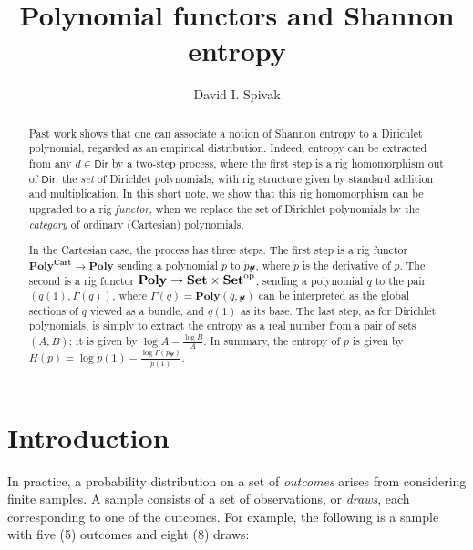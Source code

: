 \documentclass[11pt, one side, article]{memoir}
\theoremstyle{definition}
\theoremstyle{plain}
\newcommand{\Set}[1]{\mathsf{#1}}%
\newcommand{\Cat}[1]{\mathbf{#1}}%
\newcommand{\op}{^\tn{op}}
\newcommand{\tn}[1]{\textnormal{#1}}
\newcommand{\smset}{\Cat{Set}}
\newcommand{\yon}{\mathcal{y}}
\newcommand{\poly}{\Cat{Poly}}
\newcommand{\dir}{\Set{Dir}}
\newcommand{\polycart}{\poly^{\Cat{Cart}}}
\newcommand{\0}{\textsf{0}}
\newcommand{\1}{\tn{\textsf{1}}}
\begin{document}
\title{Polynomial functors and Shannon entropy}

\author{David I. Spivak}

\date{\vspace{-.2in}}

\maketitle

\begin{abstract}
Past work shows that one can associate a notion of Shannon entropy to a Dirichlet polynomial, regarded as an empirical distribution. Indeed, entropy can be extracted from any $d\in\dir$ by a two-step process, where the first step is a rig homomorphism out of $\dir$, the \emph{set} of Dirichlet polynomials, with rig structure given by standard addition and multiplication. In this short note, we show that this rig homomorphism can be upgraded to a rig \emph{functor}, when we replace the set of Dirichlet polynomials by the \emph{category} of ordinary (Cartesian) polynomials.

In the Cartesian case, the process has three steps. The first step is a rig functor $\polycart\to\poly$ sending a polynomial $p$ to $\dot{p}\yon$, where $\dot{p}$ is the derivative of $p$. The second is a rig functor $\poly\to\smset\times\smset\op$, sending a polynomial $q$ to the pair $(q(1),\Gamma(q))$, where $\Gamma(q)=\poly(q,\yon)$ can be interpreted as the global sections of $q$ viewed as a bundle, and $q(1)$ as its base. The last step, as for Dirichlet polynomials, is simply to extract the entropy as a real number from a pair of sets $(A,B)$; it is given by $\log A-\frac{\log B}{A}$. In summary, the entropy of $p$ is given by $H(p)=\log \dot{p}(1)-\frac{\log\Gamma(\dot{p}\yon)}{\dot{p}(1)}$.
\end{abstract}

\chapter{Introduction}

In practice, a probability distribution on a set of \emph{outcomes} arises from considering finite samples. A sample consists of a set of observations, or \emph{draws}, each corresponding to one of the outcomes. For example, the following is a sample with five (5) outcomes and eight (8) draws:
\end{document}
